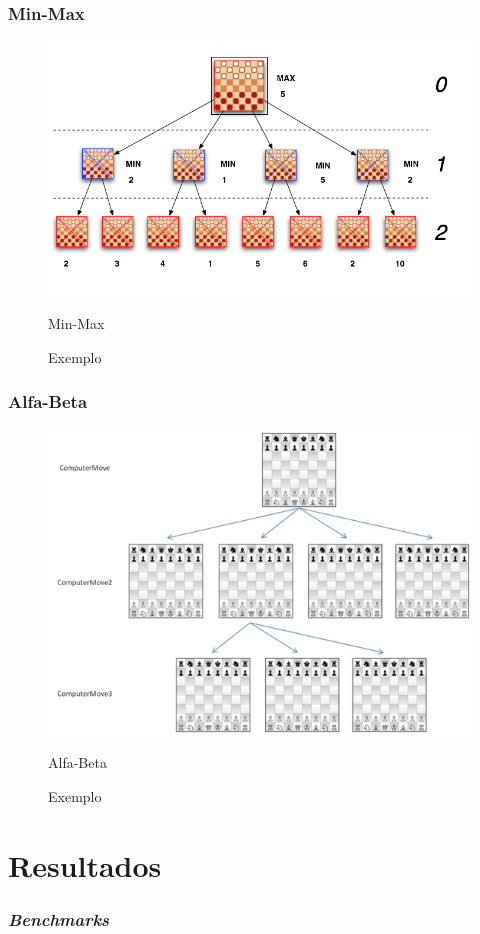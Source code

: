 \documentclass[yellow]{beamer}
\begin{document}
\begin{frame}
  \frametitle{Min-Max}
  \begin{figure}[!hpbt]
	  \centering
	  \begin{minipage}{1\textwidth}
		    \centering
		      \includegraphics[width=.8\linewidth]{minimax.png}
		        \caption{Exemplo}{Min-Max}
			  \label{fig:1}
		  \end{minipage}
	  \end{figure}
  \end{frame}

\begin{frame}
  \frametitle{Alfa-Beta}
  \begin{figure}[!hpbt]
	  \centering
	  \begin{minipage}{1\textwidth}
		    \centering
		      \includegraphics[width=.8\linewidth]{huoChess_2.jpg}
		        \caption{Exemplo}{Alfa-Beta}
			  \label{fig:1}
		  \end{minipage}
	  \end{figure}
  \end{frame}


\section{Resultados}


\begin{frame}
	\frametitle{\textit{Benchmarks}}
\end{frame}
\end{document}
